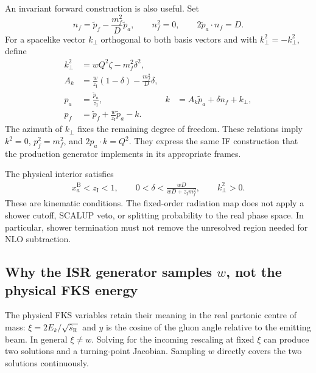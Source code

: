 \documentclass[11pt,a4paper]{article}
\newcommand{\zI}{z_{\mathrm{I}}}
\newcommand{\kt}{k_{\perp}}
\begin{document}
An invariant forward construction is also useful. Set
\begin{equation}
 n_f=\widetilde p_f-\frac{m_f^2}{D}\widetilde p_a,
 \qquad n_f^2=0,\qquad 2\widetilde p_a\cdot n_f=D.
\end{equation}
For a spacelike vector $k_\perp$ orthogonal to both basis vectors and with
$k_\perp^2=-\kt^2$, define
\begin{align}
 \kt^2&=wQ^2\zeta-m_f^2\delta^2,\label{eq:kt}\\
 A_k&=\frac{w}{\zI}(1-\delta)-\frac{m_f^2}{D}\delta,\\
 p_a&=\frac{\widetilde p_a}{\zI},&
 k&=A_k\widetilde p_a+\delta n_f+k_\perp,\\
 p_f&=\widetilde p_f+\frac{w}{\zI}\widetilde p_a-k.
\end{align}
The azimuth of $k_\perp$ fixes the remaining degree of freedom. These
relations imply $k^2=0$, $p_f^2=m_f^2$, and $2p_a\cdot k=Q^2$.
They express the same IF construction that the production generator
implements in its appropriate frames.

The physical interior satisfies
\begin{align}
 x_a^{\mathrm B}<\zI<1,\qquad
 0<\delta<\frac{wD}{wD+\zI m_f^2},\qquad
 \kt^2>0.\label{eq:support}
\end{align}
These are kinematic conditions. The fixed-order radiation map does not apply
a shower cutoff, SCALUP veto, or splitting probability to the real phase
space. In particular, shower termination must not remove the unresolved
region needed for NLO subtraction.

\subsection{Why the ISR generator samples \texorpdfstring{$w$}{w}, not the physical FKS energy}

The physical FKS variables retain their meaning in the real partonic centre
of mass: $\xi=2E_k/\sqrt{\hat s_{\mathrm R}}$ and $y$ is the cosine of the
gluon angle relative to the emitting beam. In general $\xi\ne w$. Solving for
the incoming rescaling at fixed $\xi$ can produce two solutions and a
turning-point Jacobian. Sampling $w$ directly covers the two solutions
continuously.
\end{document}
